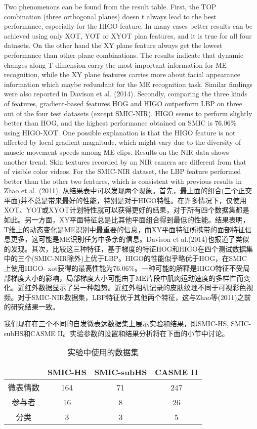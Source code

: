 Two phenomenons can be found from the result table. First, the TOP combination (three orthogonal planes) doesn t always lead to the best performance, especially for the HIGO feature. In many cases better results can be achieved using only XOT, YOT or XYOT plan features, and it is true for all four datasets. On the other hand the XY plane feature always get the lowest performance than other plane combinations. The results indicate that dynamic changes along T dimension carry the most important information for ME recognition, while the XY plane features carries more about facial appearance information which maybe redundant for the ME recognition task. Similar findings were also reported in Davison et al. (2014). Secondly, comparing the three kinds of features, gradient-based features HOG and HIGO outperform LBP on three out of the four test datasets (except SMIC-NIR). HIGO seems to perform slightly better than HOG, and the highest performance obtained on SMIC is 76.06\% using HIGO-XOT. One possible explanation is that the HIGO feature is not affected by local gradient magnitude, which might vary due to the diversity of muscle movement speeds among ME clips. Results on the NIR data shows another trend. Skin textures recorded by an NIR camera are different from that of visible color videos. For the SMIC-NIR dataset, the LBP feature performed better than the other two features, which is consistent with previous results in Zhao et al. (2011).
从结果表中可以发现两个现象。首先，最上面的组合(三个正交平面)并不总是带来最好的性能，特别是对于HIGO特性。在许多情况下，仅使用XOT、YOT或XYOT计划特性就可以获得更好的结果，对于所有四个数据集都是如此。另一方面，XY平面特征总是比其他平面组合得到最低的性能。结果表明，T维上的动态变化是ME识别中最重要的信息，而XY平面特征所携带的面部特征信息更多，这可能是ME识别任务中多余的信息。Davison et al.(2014)也报道了类似的发现。其次，比较这三种特征，基于梯度的特征HOG和HIGO在四个测试数据集中的三个(SMIC-NIR除外)上优于LBP。HIGO的性能似乎略优于HOG，在SMIC上使用HIGO- xot获得的最高性能为76.06\%。一种可能的解释是HIGO特征不受局部梯度大小的影响，局部梯度大小可能由于ME片段中肌肉运动速度的多样性而变化。近红外数据显示了另一种趋势。近红外相机记录的皮肤纹理不同于可视彩色视频。对于SMIC-NIR数据集，LBP特征优于其他两个特征，这与Zhao等(2011)之前的研究结果一致。

我们现在在三个不同的自发微表达数据集上展示实验和结果，即SMIC-HS, SMIC-subHS和CASME II。实验参数的设置和结果分析将在下面的小节中讨论。

\begin{table}[!htb]
\centering
\caption{实验中使用的数据集}
\label{tab4}
\begin{tabular}{c|ccc}
\hline
 & SMIC-HS & SMIC-subHS & CASME II \\ \hline
微表情数 & 164 & 71 & 247 \\
参与者 & 16 & 8 & 26 \\
分类 & 3 & 3 & 5 \\ \hline
\end{tabular}
\end{table}

